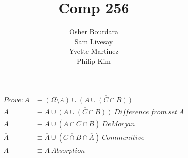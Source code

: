 \documentclass[a4paper,12pt]{article}
\title{Comp 256}
\author{Osher Bourdara\\Sam Livesay\\Yvette Martinez\\Philip Kim}
\begin{document}
\maketitle
\begin{align}
  Prove: \overline{A} &\equiv \left(\Omega \setminus A \right) \cup \overline{\left(A \cup \left( C \cap B \right)\right)} \\
  \overline{A} &\equiv \overline{A} \cup \overline{\left(A \cup \left(C \cap B\right) \right)}~Difference~from~set~A\\
  \overline{A} &\equiv \overline{A} \cup \left(\overline{A} \cap \overline{C \cap B} \right)~DeMorgan\\
  \overline{A} &\equiv \overline{A} \cup \left( \overline{C \cap B} \cap \overline{A} \right)~Communitive\\
  \overline{A} &\equiv \overline{A}~Absorption
\end{align}
\end{document}
